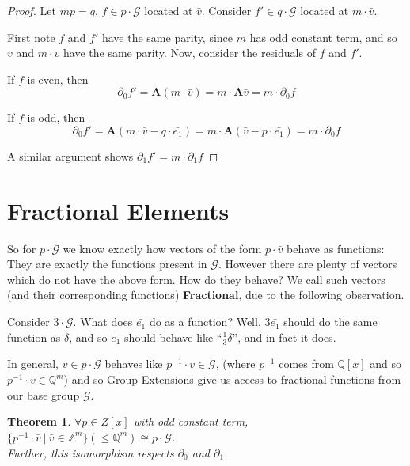 \documentclass[12pt]{article}
\newcommand{\G}{\mathcal{G}}
\newcommand{\Z}{\mathbb{Z}}
\newcommand{\Q}{\mathbb{Q}}
\newcommand{\2}{\textbf{2}}
\newcommand{\Am}{\textbf{A}}
\newcommand{\del}{\partial}
\renewcommand{\v}{\bar{v}}
\newtheorem{thm}{Theorem}
\begin{document}
\begin{proof}
  Let $mp = q$, $f \in p \cdot \G$ located at $\v$.
  Consider $f' \in q \cdot \G$ located at $m \cdot \v$.

  First note $f$ and $f'$ have the same parity, since 
  $m$ has odd constant term, and so $\v$ and $m \cdot \v$
  have the same parity. Now, consider the residuals of $f$ and $f'$. 
  
  If $f$ is even, then 
  \[ \del_0 f' = \Am (m \cdot \v) = m \cdot \Am \v = m \cdot \del_0 f \]

  If $f$ is odd, then
  \[ \del_0 f' = \Am (m \cdot \v - q \cdot \bar{e_1}) 
               = m \cdot \Am (\v - p \cdot \bar{e_1})
               = m \cdot \del_0 f \]

  A similar argument shows $\del_1 f' = m \cdot \del_1 f$
\end{proof}

\section{Fractional Elements}
So for $p \cdot \G$ we know exactly how vectors of the form $p \cdot \v$
behave as functions: They are exactly the functions present in $\G$.
However there are plenty of vectors which do not have the above form. 
How do they behave? We call such vectors (and their corresponding functions)
\textbf{Fractional}, due to the following observation.

Consider $3 \cdot \G$. What does $\bar{e_1}$ do as a function?
Well, $3\bar{e_1}$ should do the same function as $\delta$, and so
$\bar{e_1}$ should behave like ``$\frac{1}{3}\delta$'', and in fact it does.

In general, $\v \in p \cdot \G$ behaves like $p^{-1} \cdot \v \in \G$,
(where $p^{-1}$ comes from $\Q[x]$ and so $p^{-1} \cdot \v \in \Q^m$)
and so Group Extensions give us access to fractional functions from 
our base group $\G$.

\begin{thm}
  $\forall p \in Z[x]$ with odd constant term,\\
  $\{ p^{-1} \cdot \v~|~\v \in \Z^m \} (\leq \Q^m) \cong p \cdot \G$.\\
  Further, this isomorphism respects $\del_0$ and $\del_1$.
\end{thm}
\end{document}
